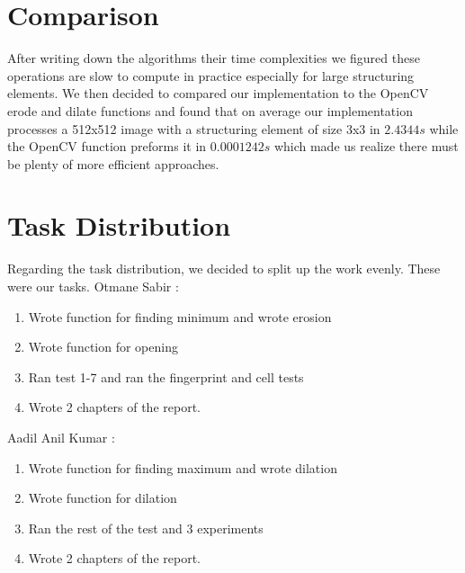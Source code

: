\documentclass{article}
\begin{document}
\newpage

\section{Comparison}
\begin{flushleft}
After writing down the algorithms their time complexities we figured these operations are slow to compute in practice especially for large structuring elements. We then decided to compared our implementation to the OpenCV erode and dilate functions and found that on average our implementation processes a 512x512 image with a structuring element of size 3x3 in $2.4344s$ while the OpenCV function preforms it in $0.0001242s$ which made us realize there must be plenty of more efficient approaches. 
\end{flushleft}

\section{Task Distribution}
\begin{flushleft}
Regarding the task distribution, we decided to split up the work evenly. These were our tasks. \newline
Otmane Sabir : \newline
\begin{enumerate}
    \item Wrote function for finding minimum and wrote erosion
    \item Wrote function for opening
    \item Ran test 1-7 and ran the fingerprint and cell tests
    \item Wrote 2 chapters of the report.
\end{enumerate}
Aadil Anil Kumar : \newline
\begin{enumerate}
    \item Wrote function for finding maximum and wrote dilation
    \item Wrote function for dilation
    \item Ran the rest of the test and 3 experiments
    \item Wrote 2 chapters of the report.
\end{enumerate}
\end{flushleft}
\end{document}
